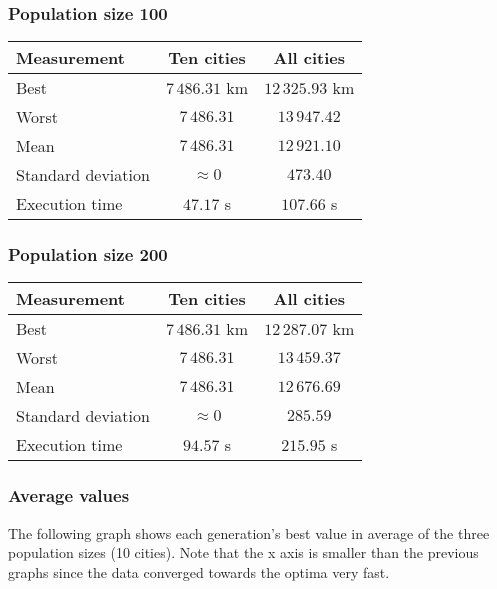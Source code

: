 \documentclass{article}
\begin{document}
\subsubsection*{Population size 100}

\begin{center}
\begin{tabular}{lcc}
\toprule
Measurement & Ten cities & All cities \\
\midrule
Best & $7\,486.31$ km & $12\,325.93$ km \\
Worst & $7\,486.31$ & $13\,947.42$ \\
Mean & $7\,486.31$ & $12\,921.10$ \\
Standard deviation & $\approx 0$ & $473.40$ \\
Execution time & $47.17$ s & $107.66$ s \\
\bottomrule
\end{tabular}
\end{center}

\subsubsection*{Population size 200}

\begin{center}
\begin{tabular}{lcc}
\toprule
Measurement & Ten cities & All cities \\
\midrule
Best & $7\,486.31$ km & $12\,287.07$ km \\
Worst & $7\,486.31$ & $13\,459.37$ \\
Mean & $7\,486.31$ & $12\,676.69$ \\
Standard deviation & $\approx 0$ & $285.59$ \\
Execution time & $94.57$ s & $215.95$ s \\
\bottomrule
\end{tabular}
\end{center}

\subsubsection*{Average values}

The following graph shows each generation's best value in average of the three population sizes (10 cities). Note that the x axis is smaller than the previous graphs since the data converged towards the optima very fast.
\end{document}
